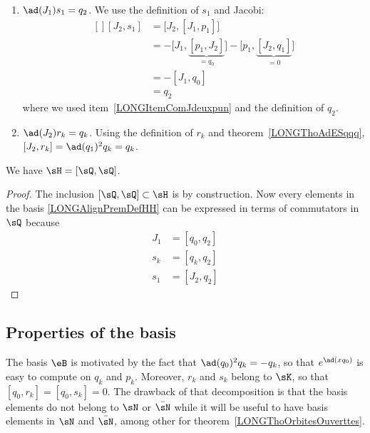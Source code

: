 \begin{enumerate}
	\item$\ad(J_1)s_1=q_2$. We use the definition of $s_1$ and Jacobi:
	\begin{equation}
		\begin{aligned}[]
			[J_2,s_1] & =\big[ J_2,[J_1,p_1] \big]                                                                  \\
			          & =-\big[ J_1,\underbrace{[p_1,J_2]}_{=q_0} \big]-\big[ p_1,\underbrace{[J_2,q_1]}_{=0} \big] \\
			          & =-[J_1,q_0]                                                                                 \\
			          & =q_2
		\end{aligned}
	\end{equation}
	where we used item~\ref{LONGItemComJdeuxpun} and the definition of $q_2$.
	\item$\ad(J_2)r_k=q_k$. Using the definition of $r_k$ and theorem~\ref{LONGThoAdESqqq}, $[J_2,r_k]=\ad(q_1)^2q_k=q_k$.
\end{enumerate}

\begin{proposition}
	We have $\sH=[\sQ,\sQ]$.
\end{proposition}

\begin{proof}
	The inclusion $[\sQ,\sQ]\subset\sH$ is by construction. Now every elements in the basis \eqref{LONGAlignPremDefHH} can be expressed in terms of commutators in $\sQ$ because
	\begin{subequations}
		\begin{align}
			J_1 & =[q_0,q_2]                     \\
			s_k & =[q_k,q_2]                     \\
			s_1 & =[J_2,q_2]	\label{LONGEqJdqdsu}
		\end{align}
	\end{subequations}
\end{proof}

%
\subsection{Properties of the basis}
%


The basis $\eB$ is motivated by the fact that $\ad(q_0)^2q_k=-q_k$, so that $ e^{\ad(xq_0)}$ is easy to compute on $q_k$ and $p_k$. Moreover, $r_k$ and $s_k$ belong to $\sK$, so that $[q_0,r_k]=[q_0,s_k]=0$. The drawback of that decomposition is that the basis elements do not belong to $\sN$ or $\bar\sN$ while it will be useful to have basis elements in $\sN$ and $\bar\sN$, among other for theorem~\ref{LONGThoOrbitesOuverttes}.

